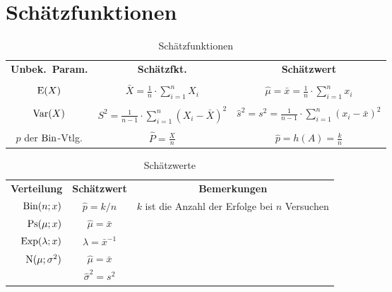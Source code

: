 \section{Schätzfunktionen}

\begin{table}[htb]
\centering
\begin{tabular}{ccc}
\bfseries Unbek.~Param. & \bfseries Schätzfkt.                                   & \bfseries Schätzwert \\ & & \\
$\operatorname{E}(X)$                 & $\bar X = \frac{1}{n} \cdot \sum_{i=1}^n X_i$          & $\hat \mu = \bar x = \frac{1}{n} \cdot \sum_{i=1}^n x_i$ \\ & & \\
$\operatorname{Var}(X)$               & $S^2 = \frac{1}{n-1} \cdot \sum_{i=1}^n(X_i-\bar X)^2$ & $\hat s^2 = s^2 = \frac{1}{n-1} \cdot \sum_{i=1}^n (x_i - \bar x)^2$ \\ & & \\
$p$ der $\operatorname{Bin}$-Vtlg.    & $\hat P = \frac{X}{n}$                                 & $\hat p = h(A) = \frac{k}{n}$
\end{tabular}

\caption{Schätzfunktionen}
\end{table}


\begin{table}[htb]
\centering
\begin{tabular}{rcc}
\bfseries Verteilung & \bfseries Schätzwert & \bfseries Bemerkungen \\
$\operatorname{Bin}(n;x)$       & $\hat p = k/n$               & $k$ ist die Anzahl der Erfolge bei $n$ Versuchen \\
$\operatorname{Ps}(\mu;x)$      & $\hat{\mu}=\bar{x}$          & \\
$\operatorname{Exp}(\lambda;x)$ & $\hat{\lambda}=\bar{x}^{-1}$ & \\
\multirow{2}{*}{$\operatorname{N}(\mu;\sigma^{2})$} & $\hat{\mu} = \bar{x}$      & \\
                                      & $\hat{\sigma}^2 = s^2$ & \\
\end{tabular}

\caption{Schätzwerte}
\end{table}

